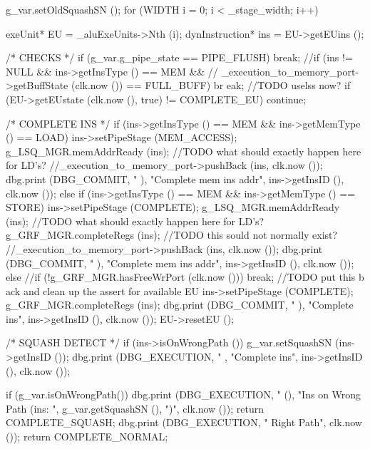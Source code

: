 \begin{DoxyCode}
                                                        {
    g_var.setOldSquashSN ();
    for (WIDTH i = 0; i < _stage_width; i++) {
        exeUnit* EU = _aluExeUnits->Nth (i);
        dynInstruction* ins = EU->getEUins ();

        /* CHECKS */
        if (g_var.g_pipe_state == PIPE_FLUSH) break;
      //if (ins != NULL && ins->getInsType () == MEM && 
      //    _execution_to_memory_port->getBuffState (clk.now ()) == FULL_BUFF) br
      eak; //TODO uselss now?
        if (EU->getEUstate (clk.now (), true) != COMPLETE_EU) continue;

        /* COMPLETE INS */
        if (ins->getInsType () == MEM && ins->getMemType () == LOAD) {
            ins->setPipeStage (MEM_ACCESS);
            g_LSQ_MGR.memAddrReady (ins); //TODO what should exactly happen here 
      for LD's?
            //_execution_to_memory_port->pushBack (ins, clk.now ());
            dbg.print (DBG_COMMIT, "%
      ), "Complete mem ins addr", ins->getInsID (), clk.now ());
        } else if (ins->getInsType () == MEM && ins->getMemType () == STORE) {
            ins->setPipeStage (COMPLETE);
            g_LSQ_MGR.memAddrReady (ins); //TODO what should exactly happen here 
      for LD's?
            g_GRF_MGR.completeRegs (ins); //TODO this sould not normally exist?
            //_execution_to_memory_port->pushBack (ins, clk.now ());
            dbg.print (DBG_COMMIT, "%
      ), "Complete mem ins addr", ins->getInsID (), clk.now ());
        } else {
            //if (!g_GRF_MGR.hasFreeWrPort (clk.now ())) break; //TODO put this b
      ack and clean up the assert for available EU
            ins->setPipeStage (COMPLETE);
            g_GRF_MGR.completeRegs (ins);
            dbg.print (DBG_COMMIT, "%
      ), "Complete ins", ins->getInsID (), clk.now ());
        }
        EU->resetEU ();

        /* SQUASH DETECT */
        if (ins->isOnWrongPath ()) {
            g_var.setSquashSN (ins->getInsID ());
        }
        dbg.print (DBG_EXECUTION, "%
      , "Complete ins", ins->getInsID (), clk.now ());
    }

    if (g_var.isOnWrongPath()) {
        dbg.print (DBG_EXECUTION, "%
       (), "Ins on Wrong Path (ins: ", g_var.getSquashSN (), ")", clk.now ());
        return COMPLETE_SQUASH;
    }
    dbg.print (DBG_EXECUTION, "%
       Right Path", clk.now ());
    return COMPLETE_NORMAL;
}
\end{DoxyCode}


